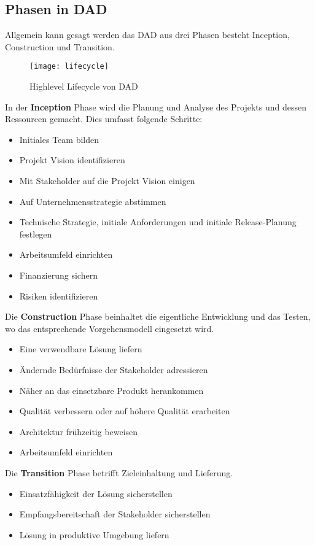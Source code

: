 \subsection{Phasen in DAD}
Allgemein kann gesagt werden das DAD aus drei Phasen besteht Inception, Construction und Transition.\smallskip
\begin{figure}[H]
	\centering
	\texttt{[image: lifecycle]}
	\caption{Highlevel Lifecycle von DAD}
	\label{fig:lifecycle}
\end{figure}\medskip
In der \textbf{Inception} Phase wird die Planung und Analyse des Projekts und dessen Ressourcen gemacht. Dies umfasst folgende Schritte:\smallskip
\begin{itemize}
	\item Initiales Team bilden
	\item Projekt Vision identifizieren
	\item Mit Stakeholder auf die Projekt Vision einigen
	\item Auf Unternehmensstrategie abstimmen
	\item Technische Strategie, initiale Anforderungen und initiale Release-Planung festlegen
	\item Arbeitsumfeld einrichten
	\item Finanzierung sichern
	\item Risiken identifizieren
\end{itemize}
\medskip
Die \textbf{Construction} Phase beinhaltet die eigentliche Entwicklung und das Testen, wo das entsprechende Vorgehensmodell eingesetzt wird.\smallskip
\begin{itemize}
	\item Eine verwendbare Lösung liefern
	\item Ändernde Bedürfnisse der Stakeholder adressieren 
	\item Näher an das einsetzbare Produkt herankommen
	\item Qualität verbessern oder auf höhere Qualität erarbeiten
	\item Architektur frühzeitig beweisen
	\item Arbeitsumfeld einrichten
\end{itemize}\medskip
Die \textbf{Transition} Phase betrifft Zieleinhaltung und Lieferung.
\begin{itemize}
	\item Einsatzfähigkeit der Lösung sicherstellen
	\item Empfangsbereitschaft der Stakeholder sicherstellen
	\item Lösung in produktive Umgebung liefern
\end{itemize}
